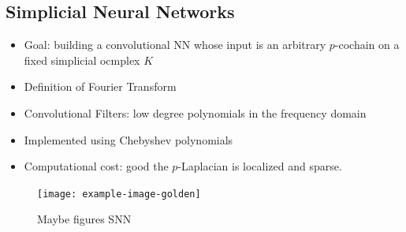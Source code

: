 \subsection{Simplicial Neural Networks}
\begin{itemize}
\item Goal: building a convolutional NN whose input is an arbitrary $p$-cochain on a fixed simplicial ocmplex $K$
\item  Definition of Fourier Transform
\item Convolutional Filters: low degree polynomials in the frequency domain
\item Implemented using Chebyshev polynomials
\item Computational cost: good the $p$-Laplacian is localized and sparse.
\end{itemize}

\begin{figure}[htbp]
  \centering

\texttt{[image: example-image-golden]}
  \caption{Maybe figures SNN} \label{fig:SNN}
\end{figure}